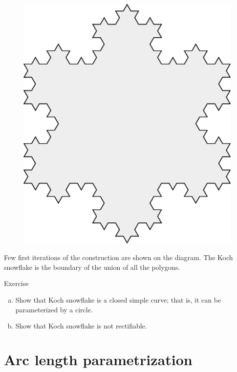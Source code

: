 \begin{figure}[h!]
\begin{minipage}{.24\textwidth}
\end{minipage}
\hfill
\begin{minipage}{.24\textwidth}
\centering
\includegraphics[scale=.15]{pics/Koch_Snowflake-3}
\end{minipage}
\end{figure}
Few first iterations of the construction are shown on the diagram.
The Koch snowflake is the boundary of the union of all the polygons.


\begin{thm}{Exercise}\label{ex:nonrectifiable-curve}
\begin{enumerate}[(a)]
\item Show that Koch snowflake is a closed simple curve; that is, it can be parameterized by a circle.
\item\label{ex:nonrectifiable-curve:b} Show that Koch snowflake is not rectifiable. 
\end{enumerate}
\end{thm}


\section*{Arc length parametrization}

